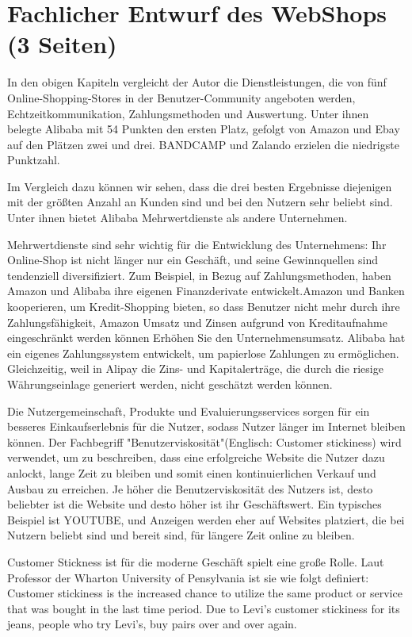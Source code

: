 
\chapter{Fachlicher Entwurf des WebShops (3 Seiten)}

In den obigen Kapiteln vergleicht der Autor die Dienstleistungen, die von fünf Online-Shopping-Stores in der Benutzer-Community angeboten werden, Echtzeitkommunikation, Zahlungsmethoden und Auswertung. Unter ihnen belegte Alibaba mit 54 Punkten den ersten Platz, gefolgt von Amazon und Ebay auf den Plätzen zwei und drei. BANDCAMP und Zalando erzielen die niedrigste Punktzahl.

Im Vergleich dazu können wir sehen, dass die drei besten Ergebnisse diejenigen mit der größten Anzahl an Kunden sind und bei den Nutzern sehr beliebt sind. Unter ihnen bietet Alibaba Mehrwertdienste als andere Unternehmen.

Mehrwertdienste sind sehr wichtig für die Entwicklung des Unternehmens: Ihr On\-line-Shop ist nicht länger nur ein Geschäft, und seine Gewinnquellen sind tendenziell diversifiziert. Zum Beispiel, in Bezug auf Zahlungsmethoden, haben Amazon und Alibaba ihre eigenen Finanzderivate entwickelt.Amazon und Banken kooperieren, um Kredit-Shopping bieten, so dass Benutzer nicht mehr durch ihre Zahlungsfähigkeit, Amazon Umsatz und Zinsen aufgrund von Kreditaufnahme eingeschränkt werden können Erhöhen Sie den Unternehmensumsatz. Alibaba hat ein eigenes Zahlungssystem entwickelt, um \glqq{}papierlose\grqq{} Zahlungen zu ermöglichen. Gleichzeitig, weil in Alipay die Zins- und Kapitalerträge, die durch die riesige Währungseinlage generiert werden, nicht geschätzt werden können.

Die Nutzergemeinschaft, Produkte und Evaluierungsservices sorgen für ein besseres Einkaufserlebnis für die Nutzer, sodass Nutzer länger im Internet bleiben können. Der Fachbegriff "Benutzerviskosität"(Englisch: Customer stickiness) wird verwendet, um zu beschreiben, dass eine erfolgreiche Website die Nutzer dazu anlockt, lange Zeit zu bleiben und somit einen kontinuierlichen Verkauf und Ausbau zu erreichen. Je höher die Benutzerviskosität des Nutzers ist, desto beliebter ist die Website und desto höher ist ihr Geschäftswert. Ein typisches Beispiel ist YOUTUBE, und Anzeigen werden eher auf Websites platziert, die bei Nutzern beliebt sind und bereit sind, für längere Zeit online zu bleiben.

Customer Stickness ist für die moderne Geschäft spielt eine große Rolle. Laut \textcite{bradlow-wharton} Professor der Wharton University of Pensylvania ist sie wie folgt definiert: \glqq{}Customer stickiness is the increased chance to utilize the same product or service that was bought in the last time period. Due to Levi’s customer stickiness for its jeans, people who try Levi’s, buy pairs over and over again.\grqq{}

